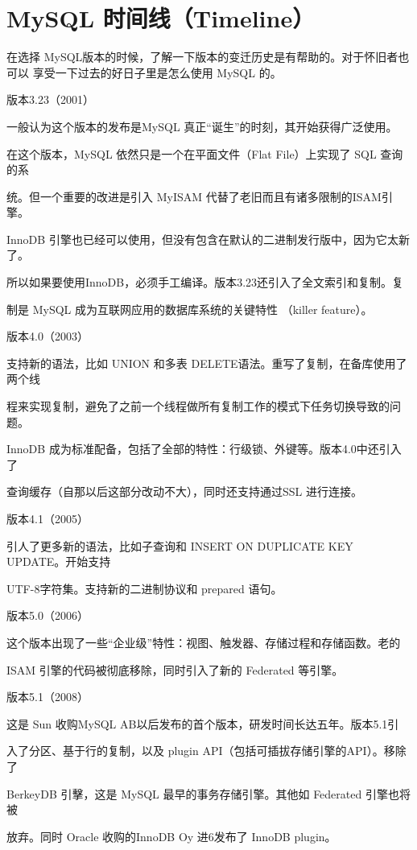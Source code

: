 \section{MySQL 时间线（Timeline）}
在选择 MySQL版本的时候，了解一下版本的变迁历史是有帮助的。对于怀旧者也可以
享受一下过去的好日子里是怎么使用 MySQL 的。

版本3.23（2001）

一般认为这个版本的发布是MySQL 真正“诞生”的时刻，其开始获得广泛使用。

在这个版本，MySQL 依然只是一个在平面文件（Flat File）上实现了 SQL 查询的系

统。但一个重要的改进是引入 MyISAM 代替了老旧而且有诸多限制的ISAM引擎。

InnoDB 引擎也已经可以使用，但没有包含在默认的二进制发行版中，因为它太新了。

所以如果要使用InnoDB，必须手工编译。版本3.23还引入了全文索引和复制。复

制是 MySQL 成为互联网应用的数据库系统的关键特性 （killer feature）。

版本4.0（2003）

支持新的语法，比如 UNION 和多表 DELETE语法。重写了复制，在备库使用了两个线

程来实现复制，避免了之前一个线程做所有复制工作的模式下任务切换导致的问题。

InnoDB 成为标准配备，包括了全部的特性：行级锁、外键等。版本4.0中还引入了

查询缓存（自那以后这部分改动不大），同时还支持通过SSL 进行连接。

版本4.1（2005）

引人了更多新的语法，比如子查询和 INSERT ON DUPLICATE KEY UPDATE。开始支持

UTF-8字符集。支持新的二进制协议和 prepared 语句。

版本5.0（2006）

这个版本出现了一些“企业级”特性：视图、触发器、存储过程和存储函数。老的

ISAM 引擎的代码被彻底移除，同时引入了新的 Federated 等引擎。

版本5.1（2008）

这是 Sun 收购MySQL AB以后发布的首个版本，研发时间长达五年。版本5.1引

入了分区、基于行的复制，以及 plugin API（包括可插拔存储引擎的API）。移除了

BerkeyDB 引擊，这是 MySQL 最早的事务存储引擎。其他如 Federated 引擎也将被

放弃。同时 Oracle 收购的InnoDB Oy 进6发布了 InnoDB plugin。


